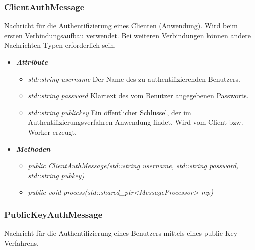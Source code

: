 \documentclass[a4paper,12pt]{article}
\begin{document}
\subsubsection{ClientAuthMessage}

Nachricht für die Authentifizierung eines Clienten (Anwendung). Wird beim ersten Verbindungsaufbau verwendet. Bei weiteren Verbindungen können andere Nachrichten Typen erforderlich sein.

	\begin{itemize}[label={}]

	\item\textit{\textbf{Attribute}}
		\begin{itemize}[label={\textbullet}]
			\item\textit{std::string username} Der Name des zu authentifizierenden Benutzers.
			\item\textit{std::string password} Klartext des vom Benutzer angegebenen Passworts.
			\item\textit{std::string publickey} Ein öffentlicher Schlüssel, der im Authentifizierungsverfahren Anwendung findet. Wird vom Client bzw. Worker erzeugt.
		\end{itemize}

	\item\textit{\textbf{Methoden}}
		\begin{itemize}[label={\textbullet}]
			\item\textit{public ClientAuthMessage(std::string username, std::string password, std::string pubkey)}
			\item\textit{public void process(std::shared\_ptr<MessageProcessor> mp)}
		\end{itemize}

\end{itemize}


\subsubsection{PublicKeyAuthMessage}

Nachricht für die Authentifizierung eines Benutzers mittels eines public Key Verfahrens.
\end{document}
